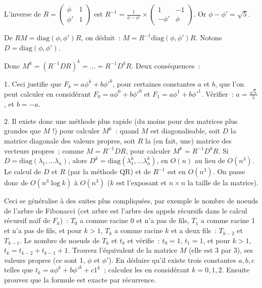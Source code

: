 \documentclass[a4paper]{article}
\begin{document}
L'inverse de $R=\left( \begin{array}{cc} \phi & 1 \\ \phi' & 1\end{array}\right)$ est $R^{-1}=\frac{1}{\phi-\phi'}\times \left( \begin{array}{cc} 1 & -1 \\ -\phi' & \phi\end{array}\right)$. Or $\phi-\phi'=\sqrt{5}$. 

De $RM= \mbox{diag}(\phi, \phi')R$, on d\'eduit~: $M=R^{-1} \mbox{diag}(\phi, \phi')R$. Notons $D=\mbox{diag}(\phi, \phi')$.

Donc $M^k=(R^{-1}DR)^k=\ldots = R^{-1} D^k R$. Deux cons\'equences~:

1. Ceci justifie que $F_k= a\phi^k + b \phi'^k$, pour certaines constantes $a$ et $b$, que l'on peut calculer en consid\'erant $F_0=a\phi^0+ b\phi'^0$ et
$F_1=a\phi^1+ b\phi'^1$. V\'erifier~: $a=\frac{\sqrt{5}}{5}$, et $b= -a$.

2. Il existe donc une m\'ethode plus rapide (du moins pour des matrices plus grandes que $M$ !) pour calculer $M^k$~: quand $M$ est diagonalisable,
soit $D$ la matrice diagonale des valeurs propres, 
soit $R$ la (en fait, une)  matrice des vecteurs propres~; comme $M=R^{-1}DR$, pour calculer $M^k=R^{-1}D^kR$.
Si $D=\mbox{diag}(\lambda_1, \ldots \lambda_n)$, alors $D^k=\mbox{diag}(\lambda_1^k, \ldots \lambda_n^k)$, en $O(n)$ au lieu de $O(n^3)$. 
Le calcul de $D$ et $R$ (par la m\'ethode QR) et de $R^{-1}$ est en $O(n^3)$. On passe donc de $O(n^3\log k)$ \`a $O(n^3)$ ($k$ est l'exposant et $n\times n$ la taille de la matrice).

Ceci se g\'en\'eralise \`a des suites plus compliqu\'ees, par exemple le nombre de noeuds de l'arbre de Fibonacci (cet arbre est l'arbre des appels r\'ecursifs dans le calcul r\'ecursif na\"if de $F_k$)~: $T_0$ a comme racine 0 et
n'a pas de fils, $T_1$ a comme racine 1 et n'a pas de fils, et 
pour $k>1$, $T_k$ a comme racine $k$ et a deux fils~: $T_{k-2}$ et $T_{k-1}$. Le nombre de noeuds de $T_k$ et $t_k$ et v\'erifie~: $t_0=1$, $t_1=1$,
et pour $k>1$, $t_k=t_{k-2}+t_{k-1}+1$. Trouvez l'\'equivalent de la matrice $M$ (elle est 3 par 3), ses valeurs propres (ce sont 1, $\phi$ et $\phi'$).
En d\'eduire qu'il existe trois constantes $a, b, c$ telles que $t_k= a \phi^k + b \phi'^k + c 1^k$~; calculez les en consid\'erant $k=0, 1, 2$.
Ensuite prouvez que la formule est exacte par r\'ecurrence.
\end{document}
